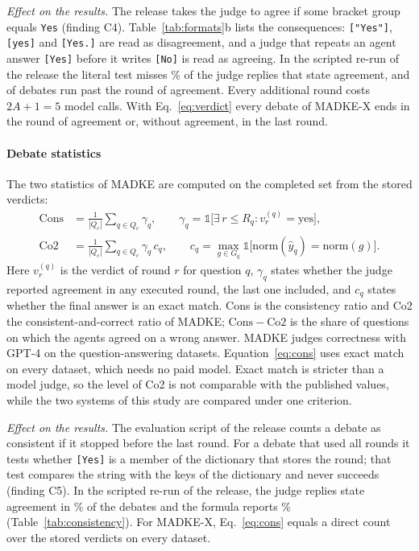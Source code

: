 \emph{Effect on the results.} The release takes the judge to agree if some bracket group equals \texttt{Yes} (finding C4). Table~\ref{tab:formats}b lists the consequences: \texttt{["Yes"]}, \texttt{[yes]} and \texttt{[Yes.]} are read as disagreement, and a judge that repeats an agent answer \texttt{[Yes]} before it writes \texttt{[No]} is read as agreeing. In the scripted re-run of the release the literal test misses \VMissedPctRel\% of the judge replies that state agreement, and \VStopLateRel{} of \VNQuestions{} debates run past the round of agreement. Every additional round costs $2A+1=5$ model calls. With Eq.~\eqref{eq:verdict} every debate of MADKE-X ends in the round of agreement or, without agreement, in the last round.

\paragraph{Debate statistics}
The two statistics of MADKE are computed on the completed set from the stored verdicts:
\begin{equation}
\begin{aligned}
\mathrm{Cons} &= \frac{1}{|Q_c|}\sum_{q\in Q_c} \gamma_q, \qquad \gamma_q = \mathbb{1}\Big[\exists\, r\le R_q : v_r^{(q)}=\text{yes}\Big],\\
\mathrm{Co2} &= \frac{1}{|Q_c|}\sum_{q\in Q_c} \gamma_q\, c_q, \qquad c_q = \max_{g\in G_q}\mathbb{1}\big[\mathrm{norm}(\hat y_q)=\mathrm{norm}(g)\big].
\end{aligned}
\label{eq:cons}
\end{equation}
Here $v_r^{(q)}$ is the verdict of round $r$ for question $q$, $\gamma_q$ states whether the judge reported agreement in any executed round, the last one included, and $c_q$ states whether the final answer is an exact match. Cons is the consistency ratio and Co2 the consistent-and-correct ratio of MADKE; $\mathrm{Cons}-\mathrm{Co2}$ is the share of questions on which the agents agreed on a wrong answer. MADKE judges correctness with GPT-4 on the question-answering datasets. Equation~\eqref{eq:cons} uses exact match on every dataset, which needs no paid model. Exact match is stricter than a model judge, so the level of Co2 is not comparable with the published values, while the two systems of this study are compared under one criterion.

\emph{Effect on the results.} The evaluation script of the release counts a debate as consistent if it stopped before the last round. For a debate that used all rounds it tests whether \texttt{[Yes]} is a member of the dictionary that stores the round; that test compares the string with the keys of the dictionary and never succeeds (finding C5). In the scripted re-run of the release, the judge replies state agreement in \VConsTrueRel\% of the debates and the formula reports \VConsFormRel\% (Table~\ref{tab:consistency}). For MADKE-X, Eq.~\eqref{eq:cons} equals a direct count over the stored verdicts on every dataset.

